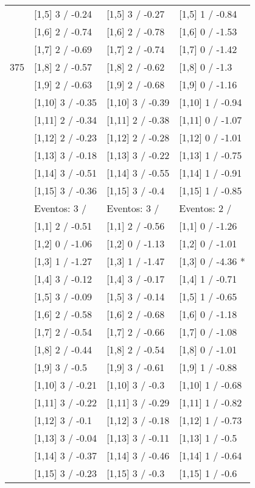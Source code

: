 \begin{table}
\begin{tabular}[t]{llll}
 & {}[1,5] 3  / -0.24 & {}[1,5] 3  / -0.27 & {}[1,5] 1  / -0.84\\
 & {}[1,6] 2  / -0.74 & {}[1,6] 2  / -0.78 & {}[1,6] 0  / -1.53\\
 & {}[1,7] 2  / -0.69 & {}[1,7] 2  / -0.74 & {}[1,7] 0  / -1.42\\
375 & {}[1,8] 2  / -0.57 & {}[1,8] 2  / -0.62 & {}[1,8] 0  / -1.3\\
\addlinespace
 & {}[1,9] 2  / -0.63 & {}[1,9] 2  / -0.68 & {}[1,9] 0  / -1.16\\
 & {}[1,10] 3  / -0.35 & {}[1,10] 3  / -0.39 & {}[1,10] 1  / -0.94\\
 & {}[1,11] 2  / -0.34 & {}[1,11] 2  / -0.38 & {}[1,11] 0  / -1.07\\
 & {}[1,12] 2  / -0.23 & {}[1,12] 2  / -0.28 & {}[1,12] 0  / -1.01\\
 & {}[1,13] 3  / -0.18 & {}[1,13] 3  / -0.22 & {}[1,13] 1  / -0.75\\
\addlinespace
 & {}[1,14] 3  / -0.51 & {}[1,14] 3  / -0.55 & {}[1,14] 1  / -0.91\\
 & {}[1,15] 3  / -0.36 & {}[1,15] 3  / -0.4 & {}[1,15] 1  / -0.85\\
 & Eventos:  3 / & Eventos:  3 / & Eventos:  2 /\\
 & {}[1,1] 2  / -0.51 & {}[1,1] 2  / -0.56 & {}[1,1] 0  / -1.26\\
 & {}[1,2] 0  / -1.06 & {}[1,2] 0  / -1.13 & {}[1,2] 0  / -1.01\\
\addlinespace
 & {}[1,3] 1  / -1.27 & {}[1,3] 1  / -1.47 & {}[1,3] 0  / -4.36 *\\
 & {}[1,4] 3  / -0.12 & {}[1,4] 3  / -0.17 & {}[1,4] 1  / -0.71\\
 & {}[1,5] 3  / -0.09 & {}[1,5] 3  / -0.14 & {}[1,5] 1  / -0.65\\
 & {}[1,6] 2  / -0.58 & {}[1,6] 2  / -0.68 & {}[1,6] 0  / -1.18\\
 & {}[1,7] 2  / -0.54 & {}[1,7] 2  / -0.66 & {}[1,7] 0  / -1.08\\
\addlinespace
500 & {}[1,8] 2  / -0.44 & {}[1,8] 2  / -0.54 & {}[1,8] 0  / -1.01\\
 & {}[1,9] 3  / -0.5 & {}[1,9] 3  / -0.61 & {}[1,9] 1  / -0.88\\
 & {}[1,10] 3  / -0.21 & {}[1,10] 3  / -0.3 & {}[1,10] 1  / -0.68\\
 & {}[1,11] 3  / -0.22 & {}[1,11] 3  / -0.29 & {}[1,11] 1  / -0.82\\
 & {}[1,12] 3  / -0.1 & {}[1,12] 3  / -0.18 & {}[1,12] 1  / -0.73\\
\addlinespace
 & {}[1,13] 3  / -0.04 & {}[1,13] 3  / -0.11 & {}[1,13] 1  / -0.5\\
 & {}[1,14] 3  / -0.37 & {}[1,14] 3  / -0.46 & {}[1,14] 1  / -0.64\\
 & {}[1,15] 3  / -0.23 & {}[1,15] 3  / -0.3 & {}[1,15] 1  / -0.6\\
\bottomrule
\end{tabular}
\end{table}

